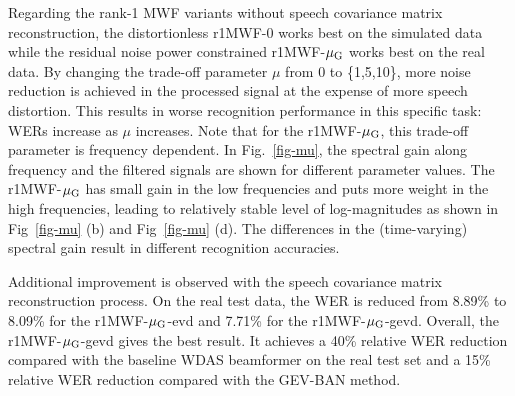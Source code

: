 \documentclass[review]{elsarticle}
\begin{document}
Regarding the rank-1 MWF variants without speech covariance matrix reconstruction, the distortionless r1MWF-0 works best on the simulated data while the residual noise power constrained r1MWF-$\mu_{\text G}$ works best on the real data. By changing the trade-off parameter $\mu$ from 0 to \{1,5,10\}, more noise reduction is achieved in the processed signal at the expense of more speech distortion. This results in worse recognition performance in this specific task: WERs increase as $\mu$ increases. Note that for the r1MWF-$\mu_{\text G}$, this trade-off parameter is frequency dependent. In Fig.~\ref{fig-mu}, the spectral gain along frequency and the filtered signals are shown for different parameter values. The r1MWF-$\mu_{\text G}$ has small gain in the low frequencies and puts more weight in the high frequencies, leading to relatively stable level of log-magnitudes as shown in Fig~\ref{fig-mu} (b) and Fig~\ref{fig-mu} (d). The differences in the (time-varying) spectral gain result in different recognition accuracies.

Additional improvement is observed with the speech covariance matrix reconstruction process. On the real test data, the WER is reduced from 8.89\% to 8.09\% for the r1MWF-$\mu_{\text G}$-evd and 7.71\% for the r1MWF-$\mu_{\text G}$-gevd. Overall, the r1MWF-$\mu_{\text G}$-gevd gives the best result. It achieves a 40\% relative WER reduction compared with the baseline WDAS beamformer on the real test set and a 15\% relative WER reduction compared with the GEV-BAN method.
\end{document}
